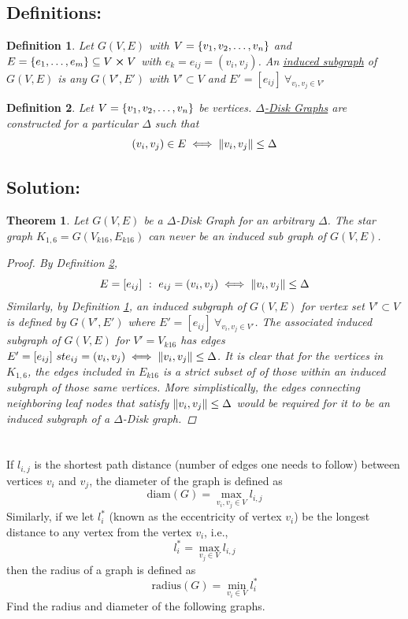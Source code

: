 \documentclass[]{article}
\numberwithin{equation}{section}
\newcommand{\st}{\ : \ }
\newtheorem{definition}{Definition}
\newtheorem{theorem}{Theorem}
\newcommand{\diam}{\text{diam}}
\newcommand{\radius}{\text{radius}}
\begin{document}
\subsection{Definitions:}
\begin{definition}\label{def:induced_subgraph}
	Let $G(V,E)$ with $V = \qty{v_1,v_2,\dots,v_n}$ 
	and $E = \qty{e_1, \dots, e_m} \subseteq V \cross V$ 
	with $e_k = e_{ij} = (v_i, v_j)$.
	An \emph{\underline{induced subgraph}} of $G(V,E)$ is any $G(V',E')$ with $V'\subset V$ and $E' = [e_{ij}] \ \forall_{v_i, v_j \in V'}$
\end{definition}

\begin{definition}\label{def:Delta-disk_graph}
	Let $V = \qty{v_1,v_2,\dots,v_n}$ be vertices.
	\emph{\underline{$\Delta$-Disk Graphs}} are constructed for a particular $\Delta$ such that \[
		(v_i,v_j) \in E \iff \norm{v_i,v_j} \leq \Delta
	\]
\end{definition}

\subsection{Solution:}
\begin{theorem}
	Let $G(V,E)$ be a $\Delta$-Disk Graph for an arbitrary $\Delta$.
	The star graph $K_{1,6} = G(V_{k16},E_{k16})$ can never be an induced sub graph of $G(V,E)$.
	\begin{proof}
		By Definition \ref{def:Delta-disk_graph}, \[
			E = [e_{ij}] \st e_{ij} = (v_i,v_j) \iff \norm{v_i,v_j} \leq \Delta
		\] Similarly, by Definition \ref{def:induced_subgraph}, an induced subgraph of $G(V,E)$ for vertex set $V' \subset V$ is defined by $G(V',E')$ where $E' = [e_{ij}] \ \forall_{v_i, v_j \in V'}$.
		The associated induced subgraph of $G(V,E)$ for $V' = V_{k16}$ has edges $E' = [e_{ij}] \ st e_{ij} = (v_i,v_j) \iff \norm{v_i,v_j} \leq \Delta$.
		It is clear that for the vertices in $K_{1,6}$, the edges included in $E_{k16}$ is a strict subset of of those within an induced subgraph of those same vertices.
		More simplistically, the edges connecting neighboring leaf nodes that satisfy $\norm{v_i,v_j} \leq \Delta$ would be required for it to be an induced subgraph of a $\Delta$-Disk graph.
	\end{proof}
\end{theorem}

\newpage
\section{}
If $l_{i,j}$ is the shortest path distance (number of edges one needs to follow) between vertices $v_i$ and $v_j$, 
the diameter of the graph is defined as\[
	\diam(G) = \max_{v_i,v_j \in V} l_{i,j}
\] Similarly, if we let $l_{i}^{*}$ (known as the eccentricity of vertex $v_i$) be the longest distance to any vertex from the vertex $v_i$, i.e.,\[
	l_{i}^{*} = \max_{v_j \in V} l_{i,j}
\] then the radius of a graph is defined as\[
	\radius(G) = \min_{v_i \in V} l_{i}^{*}
\] Find the radius and diameter of the following graphs.
\end{document}
